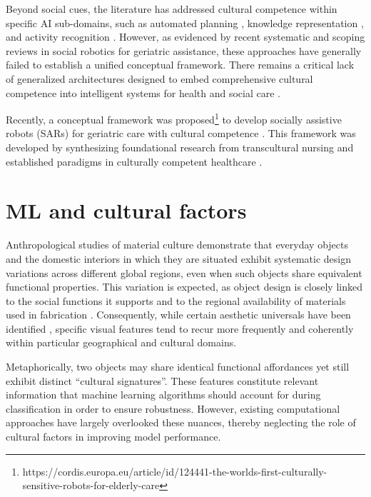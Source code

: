 Beyond social cues, the literature has addressed cultural competence within specific AI sub-domains, such as automated planning \citep{Planning, fedriga2023linguistic}, knowledge representation \citep{GreetingSelection, KnowledgeRepresentation, Grassi_2022, mansouri2020can, bringsjord2020culturally}, and activity recognition \citep{Chiang2019}. 
However, as evidenced by recent systematic and scoping reviews in social robotics for geriatric assistance, these approaches have generally failed to establish a unified conceptual framework. 
There remains a critical lack of generalized architectures designed to embed comprehensive cultural competence into intelligent systems for health and social care \citep{Abdi2018, Pu2019, Maresova2020, Lee2020}.

Recently, a conceptual framework was proposed\footnote{https://cordis.europa.eu/article/id/124441-the-worlds-first-culturally-sensitive-robots-for-elderly-care} to develop socially assistive robots (SARs) for geriatric care with cultural competence \citep{PavingTheWayCulturallyCompetent, KnowledgeRepresentation, Papadopoulos_CARESSES}. 
This framework was developed by synthesizing foundational research from transcultural nursing \citep{Leininger1988} and established paradigms in culturally competent healthcare \citep{Betancourt2003}.

\section{ML and cultural factors}
Anthropological studies of material culture demonstrate that everyday objects and the domestic interiors in which they are situated exhibit systematic design variations across different global regions, even when such objects share equivalent functional properties. This variation is expected, as object design is closely linked to the social functions it supports and to the regional availability of materials used in fabrication \citep{Robb2015}. Consequently, while certain aesthetic universals have been identified \citep{Hardonk1999, Hekkert2008}, specific visual features tend to recur more frequently and coherently within particular geographical and cultural domains.

Metaphorically, two objects may share identical functional affordances \citep{Gibson1986} yet still exhibit distinct “cultural signatures”. These features constitute relevant information that machine learning algorithms should account for during classification in order to ensure robustness. However, existing computational approaches have largely overlooked these nuances, thereby neglecting the role of cultural factors in improving model performance.

